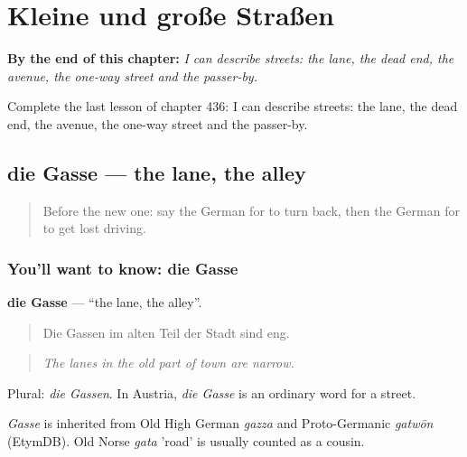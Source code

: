 
\chapter{Kleine und große Straßen}
\label{ch:ge-kleine-und-gro-e-stra-en}

\begin{chapteropening}
\textbf{By the end of this chapter:} \emph{I can describe streets: the lane, the dead end, the avenue, the one-way street and the passer-by.}

Complete the last lesson of chapter 436: I can describe streets: the lane, the dead end, the avenue, the one-way street and the passer-by.
\end{chapteropening}

\section[die Gasse]{die Gasse — the lane, the alley}

\label{lesson:GE-C436-gasse}



\begin{quote}
Before the new one: say the German for to turn back, then the German for to get lost driving.
\end{quote}

\subsection*{You'll want to know: die Gasse}
\textbf{die Gasse} — \textquotedblleft{}the lane, the alley\textquotedblright{}.

\begin{quote}
Die Gassen im alten Teil der Stadt sind eng.
\end{quote}

\begin{quote}
\emph{The lanes in the old part of town are narrow.}
\end{quote}

Plural: \emph{die Gassen}. In Austria, \emph{die Gasse} is an ordinary word for a street.

\begin{cousinweb}
\emph{Gasse} is inherited from Old High German \emph{gazza} and Proto-Germanic \emph{gatwōn} (EtymDB). Old Norse \emph{gata} 'road' is usually counted as a cousin.
\end{cousinweb}

